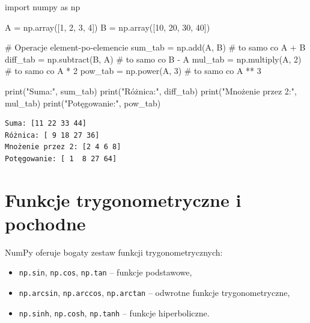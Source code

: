 \documentclass[
  letterpaper,
  DIV=11,
  numbers=noendperiod]{scrreprt}
\newenvironment{Shaded}{\begin{snugshade}}{\end{snugshade}}
\newcommand{\BuiltInTok}[1]{\textcolor[rgb]{0.00,0.23,0.31}{#1}}
\newcommand{\CommentTok}[1]{\textcolor[rgb]{0.37,0.37,0.37}{#1}}
\newcommand{\DecValTok}[1]{\textcolor[rgb]{0.68,0.00,0.00}{#1}}
\newcommand{\ImportTok}[1]{\textcolor[rgb]{0.00,0.46,0.62}{#1}}
\newcommand{\NormalTok}[1]{\textcolor[rgb]{0.00,0.23,0.31}{#1}}
\newcommand{\OperatorTok}[1]{\textcolor[rgb]{0.37,0.37,0.37}{#1}}
\newcommand{\StringTok}[1]{\textcolor[rgb]{0.13,0.47,0.30}{#1}}
\providecommand{\tightlist}{%
  \setlength{\itemsep}{0pt}\setlength{\parskip}{0pt}}\usepackage{longtable,booktabs,array}
\begin{document}
\begin{Shaded}
\begin{Highlighting}[]
\ImportTok{import}\NormalTok{ numpy }\ImportTok{as}\NormalTok{ np}

\NormalTok{A }\OperatorTok{=}\NormalTok{ np.array([}\DecValTok{1}\NormalTok{, }\DecValTok{2}\NormalTok{, }\DecValTok{3}\NormalTok{, }\DecValTok{4}\NormalTok{])}
\NormalTok{B }\OperatorTok{=}\NormalTok{ np.array([}\DecValTok{10}\NormalTok{, }\DecValTok{20}\NormalTok{, }\DecValTok{30}\NormalTok{, }\DecValTok{40}\NormalTok{])}

\CommentTok{\# Operacje element{-}po{-}elemencie}
\NormalTok{sum\_tab }\OperatorTok{=}\NormalTok{ np.add(A, B)       }\CommentTok{\# to samo co A + B}
\NormalTok{diff\_tab }\OperatorTok{=}\NormalTok{ np.subtract(B, A) }\CommentTok{\# to samo co B {-} A}
\NormalTok{mul\_tab }\OperatorTok{=}\NormalTok{ np.multiply(A, }\DecValTok{2}\NormalTok{)  }\CommentTok{\# to samo co A * 2}
\NormalTok{pow\_tab }\OperatorTok{=}\NormalTok{ np.power(A, }\DecValTok{3}\NormalTok{)     }\CommentTok{\# to samo co A ** 3}

\BuiltInTok{print}\NormalTok{(}\StringTok{"Suma:"}\NormalTok{, sum\_tab)}
\BuiltInTok{print}\NormalTok{(}\StringTok{"Różnica:"}\NormalTok{, diff\_tab)}
\BuiltInTok{print}\NormalTok{(}\StringTok{"Mnożenie przez 2:"}\NormalTok{, mul\_tab)}
\BuiltInTok{print}\NormalTok{(}\StringTok{"Potęgowanie:"}\NormalTok{, pow\_tab)}
\end{Highlighting}
\end{Shaded}

\begin{verbatim}
Suma: [11 22 33 44]
Różnica: [ 9 18 27 36]
Mnożenie przez 2: [2 4 6 8]
Potęgowanie: [ 1  8 27 64]
\end{verbatim}

\section{Funkcje trygonometryczne i
pochodne}\label{funkcje-trygonometryczne-i-pochodne}

NumPy oferuje bogaty zestaw funkcji trygonometrycznych:

\begin{itemize}
\tightlist
\item
  \texttt{np.sin}, \texttt{np.cos}, \texttt{np.tan} -- funkcje
  podstawowe,
\item
  \texttt{np.arcsin}, \texttt{np.arccos}, \texttt{np.arctan} -- odwrotne
  funkcje trygonometryczne,
\item
  \texttt{np.sinh}, \texttt{np.cosh}, \texttt{np.tanh} -- funkcje
  hiperboliczne.
\end{itemize}
\end{document}
